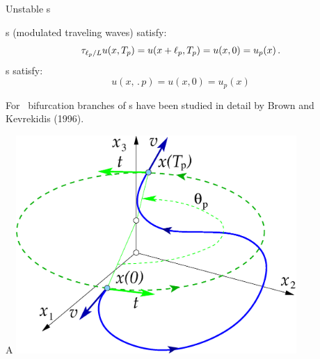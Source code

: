 \documentclass{beamer}
\begin{document}


\begin{frame}{Unstable \rpo s}


\Rpo s (modulated traveling waves) satisfy:
\[
  \tau_{\ell_p/L}u(x,{T_{p}}) =
  u(x+\ell_p,{T_{p}}) = u(x,0) = u_p(x)\,.
\]
\Po s satisfy:
\[
   u(x,\period{p}) = u(x,0)=u_p(x)
\]


For \KSe\ bifurcation branches of \rpo s have been studied in detail by Brown and Kevrekidis (1996).

\end{frame}

\begin{frame}{A \rpo}
\includegraphics[width=0.8\textwidth,clip=true]{../../figs/rpo} 
\end{frame}
\end{document}
